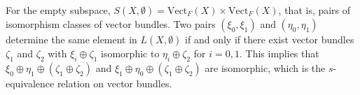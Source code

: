 For the empty subspace, $S(X, \emptyset) = \text{Vect}_F(X) \times \text{Vect}_F(X)$, that is, pairs of isomorphism classes of vector bundles. Two pairs $(\xi_0, \xi_1)$ and $(\eta_0, \eta_1)$ determine the same element in $L(X, \emptyset)$ if and only if there exist vector bundles $\zeta_1$ and $\zeta_2$ with $\xi_i \oplus \zeta_1$ isomorphic to $\eta_i \oplus \zeta_2$ for $i = 0, 1$. This implies that $\xi_0 \oplus \eta_1 \oplus (\zeta_1 \oplus \zeta_2)$ and $\xi_1 \oplus \eta_0 \oplus (\zeta_1 \oplus \zeta_2)$ are isomorphic, which is the $s$-equivalence relation on vector bundles.